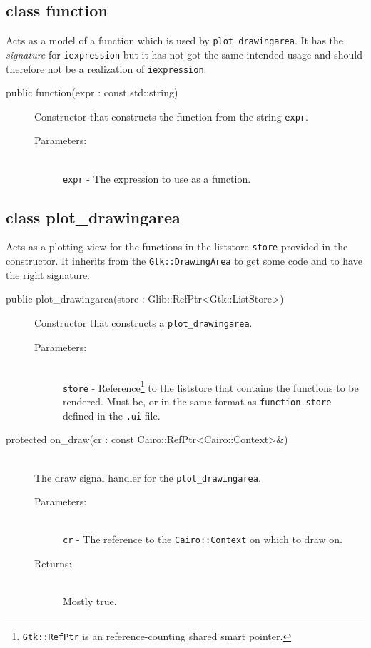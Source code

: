 \documentclass[a4paper,11pt]{kth-mag}
\begin{document}
\subsection{class function}
Acts as a model of a function which is used by \texttt{plot\_drawingarea}.
It has the \emph{signature} for \texttt{iexpression} but it has not got the
same intended usage and should therefore not be a realization of
\texttt{iexpression}.

\begin{description}
    \item[public function(expr : const std::string)] Constructor 
    that constructs the function from the string \texttt{expr}.
    \begin{description}
        \item[Parameters:]~\\
            \verb+expr+ - The expression to use as a function.
    \end{description}
\end{description}

\subsection{class plot\_drawingarea}
Acts as a plotting view for the functions in the liststore \texttt{store}
provided in the constructor. It inherits from the \texttt{Gtk::DrawingArea} to
get some code and to have the right signature.

\begin{description}
    \item[public plot\_drawingarea(store : Glib::RefPtr<Gtk::ListStore>)] Constructor 
    that constructs a \texttt{plot\_drawingarea}. 
    \begin{description}
        \item[Parameters:]~\\
            \verb+store+ - Reference\footnote{\texttt{Gtk::RefPtr} is an
            reference-counting shared smart pointer.} to the liststore that contains the
            functions to be rendered. Must be, or in the same format as
            \texttt{function\_store} defined in the \texttt{.ui}-file.
    \end{description}
\end{description}

\begin{description}
   \item[protected on\_draw(cr : const Cairo::RefPtr<Cairo::Context>\&)]~\\
   The draw signal handler for the \texttt{plot\_drawingarea}.
   \begin{description}
        \item[Parameters:]~\\
            \verb+cr+ - The reference to the \texttt{Cairo::Context} on which to draw on.
        \item[Returns:]~\\
            Mostly true.
    \end{description}
\end{description}
\end{document}

